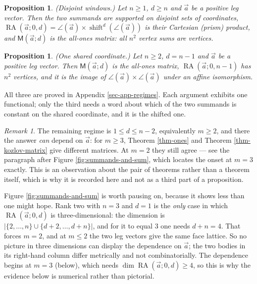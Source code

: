 \documentclass[11pt, a4paper, abstract=yes]{scrartcl}
\theoremstyle{definition}
\theoremstyle{remark}
\newtheorem{remark}[definition]{Remark}
\theoremstyle{plain}
\newtheorem{proposition}[definition]{Proposition}
\newcommand{\shift}{\operatorname{shift}}
\newcommand{\rasimp}{\angle}
\newcommand{\RA}{\operatorname{RA}}
\newcommand{\extten}{\mathsf{M}}
\newcommand{\leannone}{\tikz[baseline=-0.6ex]\draw[leannone,line width=0.6pt] (0,0) circle (0.55ex);}
\newcommand{\compmark}{\tikz[baseline=-0.6ex]\fill[compmark] (-0.55ex,-0.55ex) rectangle (0.55ex,0.55ex);}
\newcommand{\leanmark}[1]{\leavevmode{\reversemarginpar\marginnote{\raggedleft#1}}}
\begin{document}
\begin{proposition}
\leanmark{\leannone\,\compmark}(\emph{Disjoint windows.}) Let \(n\ge1\), \(d\ge n\) and \(\vec a\) be a positive leg vector. Then the
two summands are supported on disjoint sets of coordinates,
\(\RA(\vec a;0,d)=\rasimp(\vec a)\times\shift^d(\rasimp(\vec a))\) is their Cartesian (prism)
product, and \(\extten(\vec a;d)\) is the all-ones matrix: all \(n^2\) vertex sums are vertices.
\label{prop:regimes-disjoint}
\label{prop-regimes-disjoint}
\end{proposition}

\begin{proposition}
\leanmark{\leannone\,\compmark}(\emph{One shared coordinate.}) Let \(n\ge2\), \(d=n-1\) and \(\vec a\) be a positive leg vector. Then
\(\extten(\vec a;d)\) is the all-ones matrix, \(\RA(\vec a;0,n-1)\) has \(n^2\) vertices, and it is
the image of \(\rasimp(\vec a)\times\rasimp(\vec a)\) under an affine isomorphism.
\label{prop:regimes-boundary}
\label{prop-regimes-boundary}
\end{proposition}

All three are proved in Appendix \ref{sec-app-regimes}. Each argument exhibits one functional; only
the third needs a word about which of the two summands is constant on the shared coordinate, and it
is the shifted one.

\begin{remark}
The remaining regime is \(1\le d\le n-2\), equivalently \(m\ge2\), and there the answer \emph{can} depend
on \(\vec a\): for \(m\ge3\), Theorem \ref{thm-ones} and Theorem \ref{thm-kozlov-matrix} give different
matrices. At \(m=2\) they still agree --- see the paragraph after Figure \ref{fig:summands-and-sum},
which locates the onset at \(m=3\) exactly.
This is an observation about the pair of theorems rather than a theorem itself, which is why it is
recorded here and not as a third part of a proposition.
\label{rem-regimes-dependence}
\end{remark}

Figure \ref{fig:summands-and-sum} is worth pausing on, because it shows less than one might hope. Rank
two with \(n=3\) and \(d=1\) is the \emph{only} case in which \(\RA(\vec a;0,d)\) is three-dimensional:
the dimension is
\(\lvert\lbrace2,\dots,n\rbrace\cup\lbrace d+2,\dots,d+n\rbrace\rvert\), and for it to equal \(3\)
one needs \(d+n=4\). That forces \(m=2\), and at \(m\le2\) the two leg vectors give the same face
lattice. So no picture in three dimensions can display the dependence on \(\vec a\); the two bodies in
its right-hand column differ metrically and not combinatorially. The dependence begins at \(m=3\)
(below), which needs \(\dim\RA(\vec a;0,d)\ge4\), so this is why the evidence below is numerical
rather than pictorial.
\end{document}
